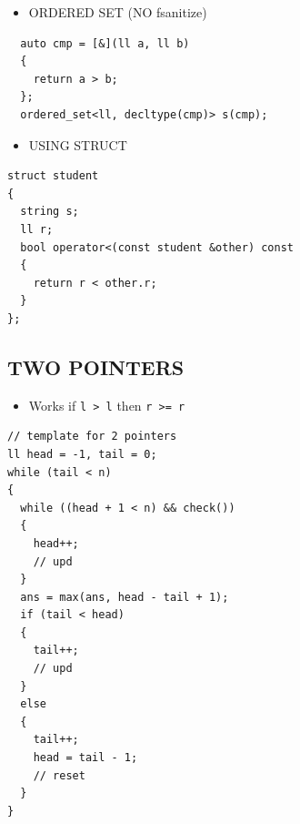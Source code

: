 \begin{itemize}
\tightlist
\item
  ORDERED SET (NO fsanitize)
\end{itemize}

\begin{verbatim}
  auto cmp = [&](ll a, ll b)
  {
    return a > b;
  }; 
  ordered_set<ll, decltype(cmp)> s(cmp); 
\end{verbatim}

\begin{itemize}
\tightlist
\item
  USING STRUCT
\end{itemize}

\begin{verbatim}
struct student
{
  string s; 
  ll r;
  bool operator<(const student &other) const
  {
    return r < other.r;
  }
};
\end{verbatim}

\hypertarget{two-pointers}{%
\subsection{TWO POINTERS}\label{two-pointers}}

\begin{itemize}
\tightlist
\item
  Works if \texttt{l\textquotesingle{}\ \textgreater{}\ l} then
  \texttt{r\textquotesingle{}\ \textgreater{}=\ r}
\end{itemize}

\begin{verbatim}
// template for 2 pointers
ll head = -1, tail = 0;
while (tail < n)
{
  while ((head + 1 < n) && check())
  {
    head++;
    // upd
  }
  ans = max(ans, head - tail + 1);
  if (tail < head)
  {
    tail++;
    // upd
  }
  else
  {
    tail++;
    head = tail - 1;
    // reset
  }
}
\end{verbatim}
